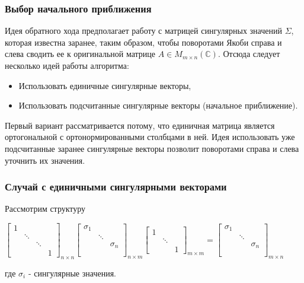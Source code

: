 \subsubsection{Выбор начального приближения}
Идея обратного хода предполагает работу с матрицей сингулярных значений $\Sigma$, которая известна заранее, таким образом, чтобы поворотами Якоби справа и слева сводить ее к оригинальной матрице $A \in M_{m\times n}(\mathbb{C})$. Отсюда следует несколько идей работы алгоритма: 
\begin{itemize}
    \item Использовать единичные сингулярные векторы,
    \item Использовать подсчитанные сингулярные векторы (начальное приближение).
\end{itemize}
Первый вариант рассматривается потому, что единичная матрица является ортогональной с ортонормированными столбцами в ней. 
Идея использовать уже подсчитанные заранее сингулярные векторы позволит поворотами справа и слева уточнить их значения. 

\subsubsection{Случай с единичными сингулярными векторами}
Рассмотрим структуру

\begin{center}
    $\begin{bmatrix}
        1 & & & \\
         & \ddots & & \\
         & & \ddots & \\
         & & & 1
    \end{bmatrix}_{n \times n}
    \begin{bmatrix}
        \sigma_1 & & \\
         & \ddots & \\
         & & \sigma_n \\
         & & \\
         & & 
    \end{bmatrix}_{n \times m}
    \begin{bmatrix}
        1 & & \\
         & \ddots & \\
         & & 1
    \end{bmatrix}_{m \times m}
    =
    \begin{bmatrix}
        \sigma_1 & & \\
         & \ddots & \\
         & & \sigma_n \\
         & & \\
         & & 
    \end{bmatrix}_{m \times n}$
    
    \vspace{1em} 
    где $\sigma_i$ - сингулярные значения.
\end{center}

